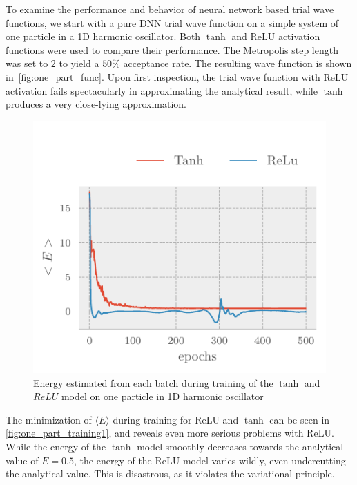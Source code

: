 To examine the performance and behavior of neural network based trial wave functions, we start with a pure DNN trial wave function on a simple system of one particle in a 1D harmonic oscillator. Both \(\tanh\) and
ReLU activation functions were used to compare their performance. The
Metropolis step length was set to \(2\) to yield a \(50\%\) acceptance rate. The
resulting wave function is shown in~\cref{fig:one_part_func}.
Upon first inspection, the trial wave function with ReLU activation 
fails spectacularly in approximating the analytical result, while
$\tanh$ produces a very close-lying approximation.


\begin{figure}[H]
	\includegraphics[]{figures/one_part_training1.pdf}
	\caption{Energy estimated from each batch during training of the $\tanh$ and $ReLU$ model on one particle in 1D harmonic oscillator}
	\label{fig:one_part_training1}
\end{figure}

The minimization of $\langle E \rangle$ during training for ReLU and $\tanh$
can be seen in \autoref{fig:one_part_training1}, and reveals even more
serious problems with ReLU. While the energy of the $\tanh$ model smoothly
decreases towards the analytical value of $E=0.5$, the energy of the ReLU
model varies wildly, even undercutting the analytical value. This is disastrous,
as it violates the variational principle.


